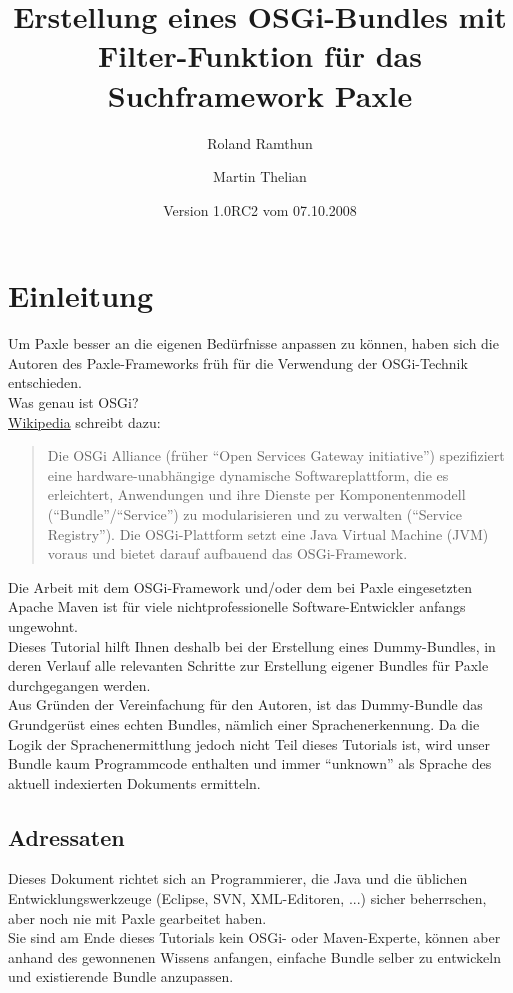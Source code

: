 \documentclass[a4paper,12pt]{scrartcl}
\title{Erstellung eines OSGi-Bundles mit Filter-Funktion für das Suchframework Paxle}
\author{Roland Ramthun \and Martin Thelian}
\date{Version 1.0RC2 vom 07.10.2008}
\begin{document}
\maketitle

\newpage

\section{Einleitung}
Um Paxle besser an die eigenen Bedürfnisse anpassen zu können, haben sich die Autoren des Paxle-Frameworks früh für die Verwendung der OSGi-Technik entschieden.\\
Was genau ist OSGi?\\
\href{http://de.wikipedia.org/w/index.php?title=OSGi&oldid=50875074}{Wikipedia} schreibt dazu:
\begin{quotation}
Die OSGi Alliance (früher "`Open Services Gateway initiative"') spezifiziert eine hardware-unabhängige dynamische Softwareplattform, die es erleichtert, Anwendungen und ihre Dienste per Komponentenmodell ("`Bundle"'/"`Service"') zu modularisieren und zu verwalten ("`Service Registry"'). Die OSGi-Plattform setzt eine Java Virtual Machine (JVM) voraus und bietet darauf aufbauend das OSGi-Framework.
\end{quotation}
Die Arbeit mit dem OSGi-Framework und/oder dem bei Paxle eingesetzten Apache Maven ist für viele nichtprofessionelle Software-Entwickler anfangs ungewohnt.\\
Dieses Tutorial hilft Ihnen deshalb bei der Erstellung eines Dummy-Bundles, in deren Verlauf alle relevanten Schritte zur Erstellung eigener Bundles für Paxle durchgegangen werden.\\
Aus Gründen der Vereinfachung für den Autoren, ist das Dummy-Bundle das Grundgerüst eines echten Bundles, nämlich einer Sprachenerkennung. Da die Logik der Sprachenermittlung jedoch nicht Teil dieses Tutorials ist, wird unser Bundle kaum Programmcode enthalten und immer "`unknown"' als Sprache des aktuell indexierten Dokuments ermitteln.
\subsection{Adressaten}
Dieses Dokument richtet sich an Programmierer, die Java und die üblichen Entwicklungswerkzeuge (Eclipse, SVN, XML-Editoren, ...) sicher beherrschen, aber noch nie mit Paxle gearbeitet haben.\\
Sie sind am Ende dieses Tutorials kein OSGi- oder Maven-Experte, können aber anhand des gewonnenen Wissens anfangen, einfache Bundle selber zu entwickeln und existierende Bundle anzupassen.\\
\end{document}
